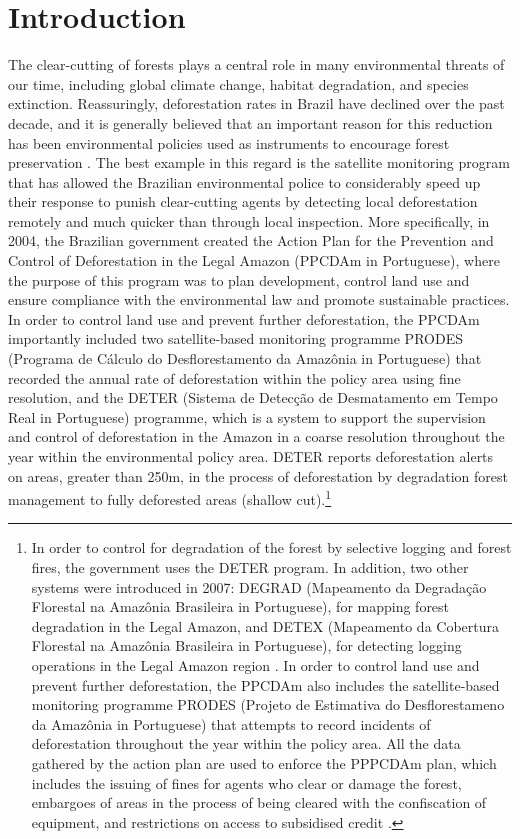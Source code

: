 \section{Introduction}
\label{S:3.1}
The clear-cutting of forests plays a central role in many environmental threats of our time, including global climate change, habitat degradation, and species extinction. Reassuringly, deforestation rates in Brazil have declined over the past decade, and it is generally believed that an important reason for this reduction has been environmental policies used as instruments to encourage forest preservation \citep{NEPSTAD, RICHARDS, RICHARDS2, CELENTANO_2017}. The best example in this regard is the satellite monitoring program that has allowed the Brazilian environmental police to considerably speed up their response to punish clear-cutting agents by detecting local deforestation remotely and much quicker than through local inspection. More specifically, in 2004, the Brazilian government created the Action Plan for the Prevention and Control of Deforestation in the Legal Amazon (PPCDAm in Portuguese), where the purpose of this program was to plan development, control land use and ensure compliance with the environmental law and promote sustainable practices. In order to control land use and prevent further deforestation, the PPCDAm importantly included two satellite-based monitoring programme PRODES (Programa de Cálculo do Desflorestamento da
Amazônia in Portuguese) \citep{inpe} that recorded the annual rate of deforestation within the policy area using fine resolution, and the DETER (Sistema de Detecção de Desmatamento em Tempo Real in Portuguese) programme, which is a system to support the supervision and control of deforestation in the Amazon in a coarse resolution throughout the year within the environmental policy area. DETER reports deforestation alerts on areas, greater than 250m, in the process of deforestation by degradation forest management to fully deforested areas (shallow cut).\footnote{In order to control for degradation of the forest by selective logging and forest fires, the government uses the DETER program. In addition, two other systems were introduced in 2007: DEGRAD (Mapeamento da Degradaç\~{a}o Florestal na Amaz\^{o}nia Brasileira in Portuguese), for mapping forest degradation in the Legal Amazon, and DETEX (Mapeamento da Cobertura Florestal na Amaz\^{o}nia Brasileira in Portuguese), for detecting logging operations in the Legal Amazon region \citep{VALERIANO}. In order to control land use and prevent further deforestation, the PPCDAm  also includes the satellite-based monitoring programme PRODES (Projeto de Estimativa do Desflorestameno da Amaz\^{o}nia in Portuguese) \citep{inpe} that attempts to record incidents of deforestation throughout the year within the policy area. All the data gathered by the action plan are used to enforce the PPPCDAm plan, which includes the issuing of fines for agents who clear or damage the forest, embargoes of areas in the process of being cleared with the confiscation of equipment, and restrictions on access to subsidised credit \citep{AUBERTIN}.}



